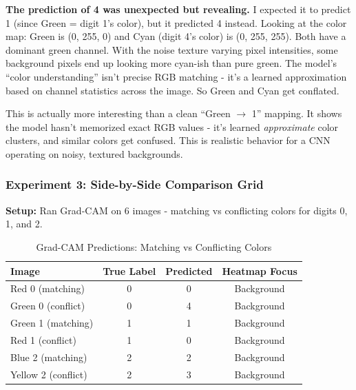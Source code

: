 \documentclass[9pt,a4paper,twocolumn,twoside]{tau-class/tau}
\begin{document}
        \begin{note}
            \textbf{The prediction of 4 was unexpected but revealing.} I expected it to predict 1 (since Green = digit 1's color), but it predicted 4 instead. Looking at the color map: Green is (0, 255, 0) and Cyan (digit 4's color) is (0, 255, 255). Both have a dominant green channel. With the noise texture varying pixel intensities, some background pixels end up looking more cyan-ish than pure green. The model's ``color understanding'' isn't precise RGB matching - it's a learned approximation based on channel statistics across the image. So Green and Cyan get conflated.

            This is actually more interesting than a clean ``Green $\rightarrow$ 1'' mapping. It shows the model hasn't memorized exact RGB values - it's learned \textit{approximate} color clusters, and similar colors get confused. This is realistic behavior for a CNN operating on noisy, textured backgrounds.
        \end{note}

        \subsubsection{Experiment 3: Side-by-Side Comparison Grid}

        \textbf{Setup:} Ran Grad-CAM on 6 images - matching vs conflicting colors for digits 0, 1, and 2.

        \begin{table}[H]
            \caption{Grad-CAM Predictions: Matching vs Conflicting Colors}
            \label{tab:day7_gradcam}
            \begin{tabular}{lccc}
            \toprule
            \textbf{Image} & \textbf{True Label} & \textbf{Predicted} & \textbf{Heatmap Focus} \\
            \midrule
            Red 0 (matching) & 0 & 0 & Background \\
            Green 0 (conflict) & 0 & 4 & Background \\
            Green 1 (matching) & 1 & 1 & Background \\
            Red 1 (conflict) & 1 & 0 & Background \\
            Blue 2 (matching) & 2 & 2 & Background \\
            Yellow 2 (conflict) & 2 & 3 & Background \\
            \bottomrule
            \end{tabular}
        \end{table}
\end{document}
